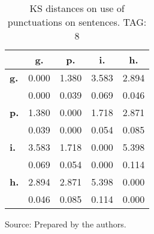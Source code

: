 \begin{table}[h!]
\begin{center}
\caption{KS distances on use of punctuations on sentences. TAG: 8}
\begin{tabular}{| l || c | c | c | c |}\hline
 & {\bf g.} & {\bf p.} & {\bf i.} & {\bf h.} \\\hline\hline
{\bf g.} & 0.000 & 1.380 & 3.583 & 2.894 \\
{\bf } & 0.000 & 0.039 & 0.069 & 0.046 \\\hline
{\bf p.} & 1.380 & 0.000 & 1.718 & 2.871 \\
{\bf } & 0.039 & 0.000 & 0.054 & 0.085 \\\hline
{\bf i.} & 3.583 & 1.718 & 0.000 & 5.398 \\
{\bf } & 0.069 & 0.054 & 0.000 & 0.114 \\\hline
{\bf h.} & 2.894 & 2.871 & 5.398 & 0.000 \\
{\bf } & 0.046 & 0.085 & 0.114 & 0.000 \\\hline
\end{tabular}
\begin{flushleft}
		Source: Prepared by the authors.\
\end{flushleft}
\end{center}
\end{table}
